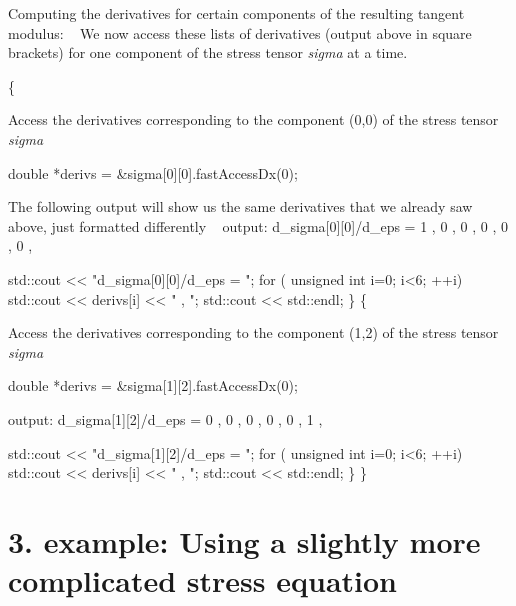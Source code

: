 Computing the derivatives for certain components of the resulting tangent modulus\+: ~\newline
We now access these lists of derivatives (output above in square brackets) for one component of the stress tensor {\itshape sigma} at a time. 
\begin{DoxyCode}
\{
\end{DoxyCode}
 Access the derivatives corresponding to the component (0,0) of the stress tensor {\itshape sigma} 
\begin{DoxyCode}
\textcolor{keywordtype}{double} *derivs = &sigma[0][0].fastAccessDx(0);
\end{DoxyCode}
 The following output will show us the same derivatives that we already saw above, just formatted differently ~\newline
output\+: d\+\_\+sigma\mbox{[}0\mbox{]}\mbox{[}0\mbox{]}/d\+\_\+eps = 1 , 0 , 0 , 0 , 0 , 0 , 
\begin{DoxyCode}
    std::cout << \textcolor{stringliteral}{"d\_sigma[0][0]/d\_eps = "};
    \textcolor{keywordflow}{for} ( \textcolor{keywordtype}{unsigned} \textcolor{keywordtype}{int} i=0; i<6; ++i)
        std::cout << derivs[i] << \textcolor{stringliteral}{" , "};
    std::cout << std::endl;
\}
\{
\end{DoxyCode}
 Access the derivatives corresponding to the component (1,2) of the stress tensor {\itshape sigma} 
\begin{DoxyCode}
\textcolor{keywordtype}{double} *derivs = &sigma[1][2].fastAccessDx(0);
\end{DoxyCode}
 output\+: d\+\_\+sigma\mbox{[}1\mbox{]}\mbox{[}2\mbox{]}/d\+\_\+eps = 0 , 0 , 0 , 0 , 0 , 1 , 
\begin{DoxyCode}
        std::cout << \textcolor{stringliteral}{"d\_sigma[1][2]/d\_eps = "};
        \textcolor{keywordflow}{for} ( \textcolor{keywordtype}{unsigned} \textcolor{keywordtype}{int} i=0; i<6; ++i)
            std::cout << derivs[i] << \textcolor{stringliteral}{" , "};
        std::cout << std::endl;
    \}
\}
\end{DoxyCode}
 \hypertarget{index_Ex3}{}\section{3. example\+: Using a slightly more complicated stress equation}\label{index_Ex3}

